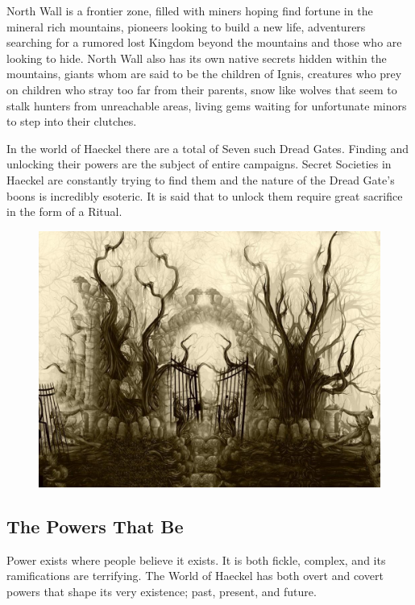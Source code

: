 \begin{multicols}{2}
North Wall is a frontier zone, filled with miners hoping find fortune in the mineral rich mountains, pioneers looking to build a new life, adventurers searching for a rumored lost Kingdom beyond the mountains and those who are looking to hide. North Wall also has its own native secrets hidden within the mountains, giants whom are said to be the children of Ignis, creatures who prey on children who stray too far from their parents, snow like wolves that seem to stalk hunters from unreachable areas, living gems waiting for unfortunate minors to step into their clutches.

In the world of Haeckel there are a total of Seven such Dread Gates. Finding and unlocking their powers are the subject of entire campaigns. Secret Societies in Haeckel are constantly trying to find them and the nature of the Dread Gate's boons is incredibly esoteric. It is said that to unlock them require great sacrifice in the form of a Ritual.

\begin{figure}[h]
\includegraphics[width=\columnwidth]{gates-of-hell-open}
\end{figure}

\subsection{The Powers That Be} Power exists where people believe it exists. It is both fickle, complex, and its ramifications are terrifying. The World of Haeckel has both overt and covert powers that shape its very existence; past, present, and future. 


\end{multicols}
